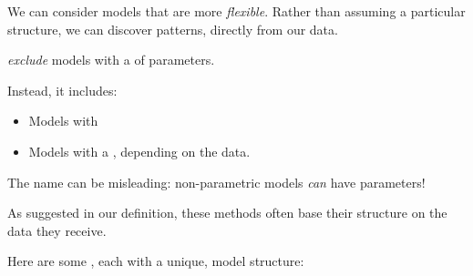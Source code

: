         We can consider models that are more \textit{flexible}. Rather than assuming a particular structure, we can discover patterns, directly from our data.\\
    
        \begin{definition}
             \textit{exclude} models with a  of parameters. 
            
    
            Instead, it includes:
    
            \begin{itemize}
                \item Models with 
                \item Models with a , depending on the data.
            \end{itemize}
    
            The name can be misleading: non-parametric models \textit{can} have parameters!
        \end{definition}
    
        As suggested in our definition, these methods often base their structure on the data they receive.

        Here are some , each with a unique,  model structure:

